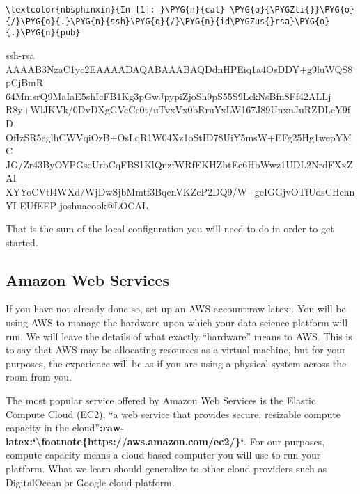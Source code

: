 \documentclass[letterpaper,10pt,english]{sphinxmanual}
\begin{document}
%
\begin{Verbatim}[commandchars=\\\{\}]
\textcolor{nbsphinxin}{In [1]: }\PYG{n}{cat} \PYG{o}{\PYGZti{}}\PYG{o}{/}\PYG{o}{.}\PYG{n}{ssh}\PYG{o}{/}\PYG{n}{id\PYGZus{}rsa}\PYG{o}{.}\PYG{n}{pub}
\end{Verbatim}



%
\begin{OriginalVerbatim}[commandchars=\\\{\}]
ssh-rsa
AAAAB3NzaC1yc2EAAAADAQABAAABAQDdnHPEiq1a4OsDDY+g9luWQS8pCjBmR
64MmsrQ9MaIaE5shIcFB1Kg3pGwJpypiZjoSh9pS55S9LckNsBfn8Ff42ALLj
R8y+WlJKVk/0DvDXgGVcCc0t/uTvxVx0bRruYxLW167J89UnxnJuRZDLeY9fD
OfIzSR5eglhCWVqiOzB+OsLqR1W04Xz1oStID78UiY5msW+EFg25Hg1wepYMC
JG/Zr43ByOYPGseUrbCqFBS1KlQnzfWRfEKHZbtEe6HbWwz1UDL2NrdFXxZAI
XYYoCVtl4WXd/WjDwSjbMmtf3BqenVKZcP2DQ9/W+geIGGjvOTfUdsCHennYI
EUfEEP joshuacook@LOCAL
\end{OriginalVerbatim}
\relax

That is the sum of the local configuration you will need to do in order
to get started.


\subsection{Amazon Web Services}
\label{\detokenize{01-amazon-web-services:Amazon-Web-Services}}
If you have not already done so, set up an AWS
account:raw-latex:.
You will be using AWS to manage the hardware upon which your data
science platform will run. We will leave the details of what exactly
“hardware” means to AWS. This is to say that AWS may be allocating
resources as a virtual machine, but for your purposes, the experience
will be as if you are using a physical system across the room from you.

The most popular service offered by Amazon Web Services is the Elastic
Compute Cloud (EC2), “a web service that provides secure, resizable
compute capacity in the
cloud”{\color{red}\bfseries{}:raw-latex:{}`\textbackslash{}footnote\{https://aws.amazon.com/ec2/\}{}`}. For our
purposes, compute capacity means a cloud-based computer you will use to
run your platform. What we learn should generalize to other cloud
providers such as DigitalOcean or Google cloud platform.
\end{document}

